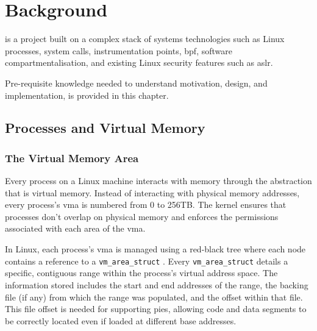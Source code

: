 \section{Background} \label{sec:background}

\af is a project built on a complex stack of systems technologies such as Linux
processes, system calls, instrumentation points, \ac{bpf}, software
compartmentalisation, and existing Linux security features such as \ac{aslr}.

Pre-requisite knowledge needed to understand \afg motivation, design, and
implementation, is provided in this chapter. 

\subsection{Processes and Virtual Memory}

\subsubsection{The Virtual Memory Area}


Every process on a Linux machine interacts with memory through the abstraction
that is virtual memory. Instead of interacting with physical memory addresses,
every process's \ac{vma} is numbered from 0 to 256TB. The kernel ensures that processes don't overlap on physical memory and
enforces the permissions associated with each area of the \ac{vma}.

In Linux, each process's \ac{vma} is managed using a
red-black tree where each node contains a reference to a
\texttt{vm\_area\_struct} . Every \texttt{vm\_area\_struct} details a specific, contiguous
range within the process's virtual address space. The information stored
includes the start and end addresses of the range, the backing file (if any)
from which the range was populated, and the offset within that file. This file
offset is needed for supporting \acp{pie}, allowing code and data segments to be correctly located even if loaded at different base addresses.

